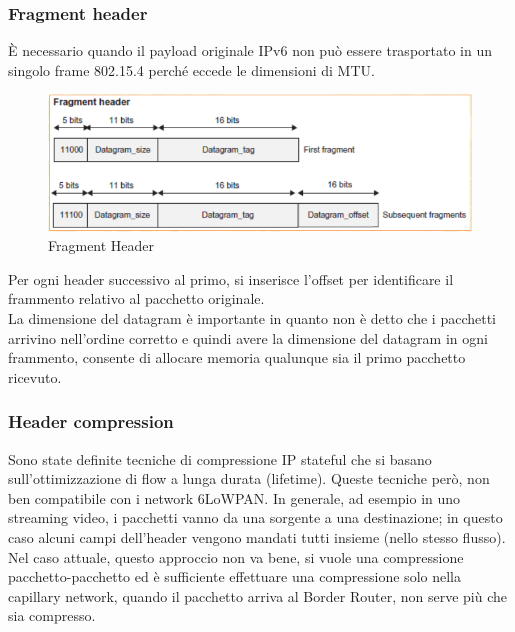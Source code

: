 \documentclass{article}
\begin{document}
\subsubsection{Fragment header}
È necessario quando il payload originale IPv6 non può essere trasportato in un singolo frame 802.15.4 perché eccede le dimensioni di MTU.
\begin{figure}[H]
\centering
\includegraphics[scale=0.5]{figures/6lowpan fragment header.png}
\caption{Fragment Header}
\end{figure}
Per ogni header successivo al primo, si inserisce l'offset per identificare il frammento relativo al pacchetto originale. \\ La dimensione del datagram è importante in quanto non è detto che i pacchetti arrivino nell'ordine corretto e quindi avere la dimensione del datagram in ogni frammento, consente di allocare memoria qualunque sia il primo pacchetto ricevuto.

\subsubsection{Header compression}
Sono state definite tecniche di compressione IP stateful che si basano sull'ottimizzazione di flow a lunga durata (lifetime). Queste tecniche però, non  ben compatibile con i network 6LoWPAN. In generale, ad esempio in uno streaming video, i pacchetti vanno da una sorgente a una destinazione; in questo caso alcuni campi dell'header vengono mandati tutti insieme (nello stesso flusso). Nel caso attuale, questo approccio non va bene, si vuole una compressione pacchetto-pacchetto ed è sufficiente effettuare una compressione solo nella capillary network, quando il pacchetto arriva al Border Router, non serve più che sia compresso.
\end{document}
